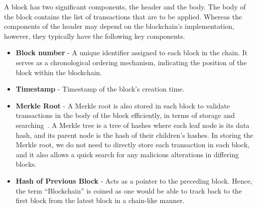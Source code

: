 \noindent A block has two significant components, the header and the body. The body of the block contains the list of transactions that are to be applied. Whereas the components of the header may depend on the blockchain's implementation, however, they typically have the following key components.
\begin{itemize}
    \item \textbf{Block number} - A unique identifier assigned to each block in the chain. It serves as a chronological ordering mechanism, indicating the position of the block within the blockchain.
    \item \textbf{Timestamp} - Timestamp of the block's creation time.
    \item \textbf{Merkle Root} - A Merkle root is also stored in each block to validate transactions in the body of the block efficiently, in terms of storage and searching~\cite{noauthor_merkle_nodate}. A Merkle tree is a tree of hashes where each leaf node is its data hash, and its parent node is the hash of their children's hashes. In storing the Merkle root, we do not need to directly store each transaction in each block, and it also allows a quick search for any malicious alterations in differing blocks.
    \item \textbf{Hash of Previous Block} - Acts as a pointer to the preceding block. Hence, the term ``Blockchain'' is coined as one would be able to track back to the first block from the latest block in a chain-like manner.
\end{itemize}

